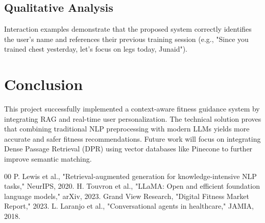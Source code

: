 \documentclass[conference]{IEEEtran}
\begin{document}
\subsection{Qualitative Analysis}
Interaction examples demonstrate that the proposed system correctly identifies the user's name and references their previous training session (e.g., "Since you trained chest yesterday, let's focus on legs today, Junaid").

\section{Conclusion}

This project successfully implemented a context-aware fitness guidance system by integrating RAG and real-time user personalization. The technical solution proves that combining traditional NLP preprocessing with modern LLMs yields more accurate and safer fitness recommendations. Future work will focus on integrating Dense Passage Retrieval (DPR) using vector databases like Pinecone to further improve semantic matching.

\begin{thebibliography}{00}
 P. Lewis et al., "Retrieval-augmented generation for knowledge-intensive NLP tasks," NeurIPS, 2020.
 H. Touvron et al., "LLaMA: Open and efficient foundation language models," arXiv, 2023.
 Grand View Research, "Digital Fitness Market Report," 2023.
 L. Laranjo et al., "Conversational agents in healthcare," JAMIA, 2018.
\end{thebibliography}
\end{document}
